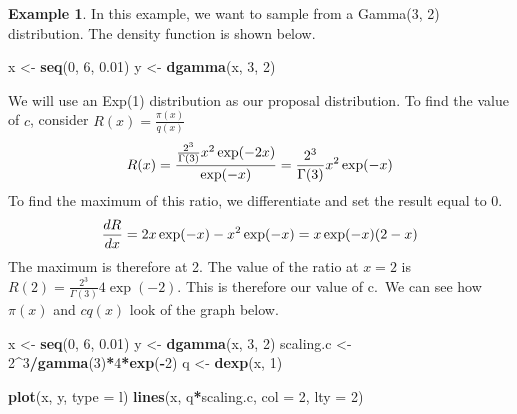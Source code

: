 \documentclass[
]{book}
\newenvironment{Shaded}{\begin{snugshade}}{\end{snugshade}}
\newcommand{\AttributeTok}[1]{\textcolor[rgb]{0.13,0.29,0.53}{#1}}
\newcommand{\DecValTok}[1]{\textcolor[rgb]{0.00,0.00,0.81}{#1}}
\newcommand{\FloatTok}[1]{\textcolor[rgb]{0.00,0.00,0.81}{#1}}
\newcommand{\FunctionTok}[1]{\textcolor[rgb]{0.13,0.29,0.53}{\textbf{#1}}}
\newcommand{\NormalTok}[1]{#1}
\newcommand{\OtherTok}[1]{\textcolor[rgb]{0.56,0.35,0.01}{#1}}
\newcommand{\SpecialCharTok}[1]{\textcolor[rgb]{0.81,0.36,0.00}{\textbf{#1}}}
\newcommand{\StringTok}[1]{\textcolor[rgb]{0.31,0.60,0.02}{#1}}
\theoremstyle{definition}
\theoremstyle{definition}
\newtheorem{example}{Example}[chapter]
\theoremstyle{definition}
\theoremstyle{definition}
\theoremstyle{remark}
\begin{document}
\begin{example}

In this example, we want to sample from a Gamma(3, 2) distribution. The density function is shown below.

\begin{Shaded}
\begin{Highlighting}[]
\NormalTok{x }\OtherTok{\textless{}{-}} \FunctionTok{seq}\NormalTok{(}\DecValTok{0}\NormalTok{, }\DecValTok{6}\NormalTok{, }\FloatTok{0.01}\NormalTok{)}
\NormalTok{y }\OtherTok{\textless{}{-}} \FunctionTok{dgamma}\NormalTok{(x, }\DecValTok{3}\NormalTok{, }\DecValTok{2}\NormalTok{)}
\end{Highlighting}
\end{Shaded}

We will use an Exp(1) distribution as our proposal distribution. To find the value of \(c\), consider \(R(x) = \frac{\pi(x)}{q(x)}\)
\[
R(x) = \frac{\frac{2^3}{\Gamma(3)}x^2\exp(-2x)}{\exp(-x)} \\
 =  \frac{2^3}{\Gamma(3)}x^2 \exp(-x)
\]
To find the maximum of this ratio, we differentiate and set the result equal to 0.
\[
\frac{dR}{dx} = 2x\exp(-x) - x^2\exp(-x)\\
= x\exp(-x)(2 - x)
\]
The maximum is therefore at 2. The value of the ratio at \(x = 2\) is \(R(2) = \frac{2^3}{\Gamma(3)}4\exp(-2)\). This is therefore our value of c.~We can see how \(\pi(x)\) and \(cq(x)\) look of the graph below.

\begin{Shaded}
\begin{Highlighting}[]
\NormalTok{x }\OtherTok{\textless{}{-}} \FunctionTok{seq}\NormalTok{(}\DecValTok{0}\NormalTok{, }\DecValTok{6}\NormalTok{, }\FloatTok{0.01}\NormalTok{)}
\NormalTok{y }\OtherTok{\textless{}{-}} \FunctionTok{dgamma}\NormalTok{(x, }\DecValTok{3}\NormalTok{, }\DecValTok{2}\NormalTok{)}
\NormalTok{scaling.c }\OtherTok{\textless{}{-}} \DecValTok{2}\SpecialCharTok{\^{}}\DecValTok{3}\SpecialCharTok{/}\FunctionTok{gamma}\NormalTok{(}\DecValTok{3}\NormalTok{)}\SpecialCharTok{*}\DecValTok{4}\SpecialCharTok{*}\FunctionTok{exp}\NormalTok{(}\SpecialCharTok{{-}}\DecValTok{2}\NormalTok{)}
\NormalTok{q }\OtherTok{\textless{}{-}} \FunctionTok{dexp}\NormalTok{(x, }\DecValTok{1}\NormalTok{)}

\FunctionTok{plot}\NormalTok{(x, y, }\AttributeTok{type =} \StringTok{\textquotesingle{}l\textquotesingle{}}\NormalTok{)}
\FunctionTok{lines}\NormalTok{(x, q}\SpecialCharTok{*}\NormalTok{scaling.c, }\AttributeTok{col =} \DecValTok{2}\NormalTok{, }\AttributeTok{lty =} \DecValTok{2}\NormalTok{)}
\end{Highlighting}
\end{Shaded}


\end{example}
\end{document}
